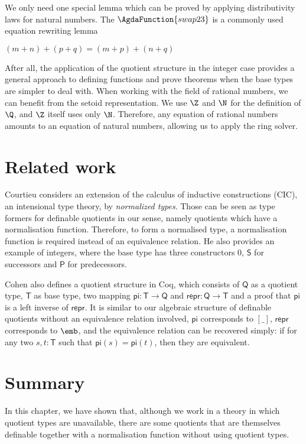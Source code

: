 We only need one special lemma which can be proved by applying distributivity
laws for natural numbers. The $\AgdaFunction{swap23}$ is a commonly
used equation rewriting lemma

$(m + n) + (p + q) = (m + p) + (n + q)$

After all, the application of the quotient structure in the integer case
provides a general approach to defining functions and prove theorems
when the base types are simpler to deal with.
When working with the field of rational numbers, we can benefit from the setoid representation. We use $\Z$ and $\N$ for the definition of $\Q$, and $\Z$ itself uses only $\N$. Therefore, any equation of rational numbers amounts to an equation of natural numbers, allowing us to apply the ring solver.

\section{Related work}

Courtieu \cite{cou:01} considers an extension of the calculus of inductive constructions (CIC), an intensional type theory, by \emph{normalized types}. 
Those can be seen as type formers for definable quotients in our sense, namely quotients which have a normalisation function. Therefore, to form a normalised type, a normalisation function is required instead of an equivalence relation. He also provides an example of integers, where the base type has three constructors $0$, $\mathsf{S}$ for successors and $\mathsf{P}$ for predecessors.


Cohen \cite{DBLP:dblp_conf/itp/Cohen13} also defines a quotient structure in Coq, which consists of $\mathsf{Q}$ as a quotient type, $\mathsf{T}$ as base type, two mapping $\mathsf{pi} : \mathsf{T} \to \mathsf{Q}$ and $\mathsf{repr} : \mathsf{Q} \to \mathsf{T}$ and a proof that $\mathsf{pi}$ is a left inverse of $\mathsf{repr}$. It is similar to our algebraic structure of definable quotients without an equivalence relation involved, $\mathsf{pi}$ corresponds to $[\_]$, $\mathsf{repr}$ corresponds to $\emb$, and the equivalence relation can be recovered simply: if for any two $s,t: \mathsf{T}$ such that $\mathsf{pi}(s) = \mathsf{pi}(t)$, then they are equivalent.

\section{Summary}

In this chapter, we have shown that, 
although we work in a theory in which quotient types are unavailable,
there are some quotients that are
themselves definable together with a normalisation function without using quotient types. 

